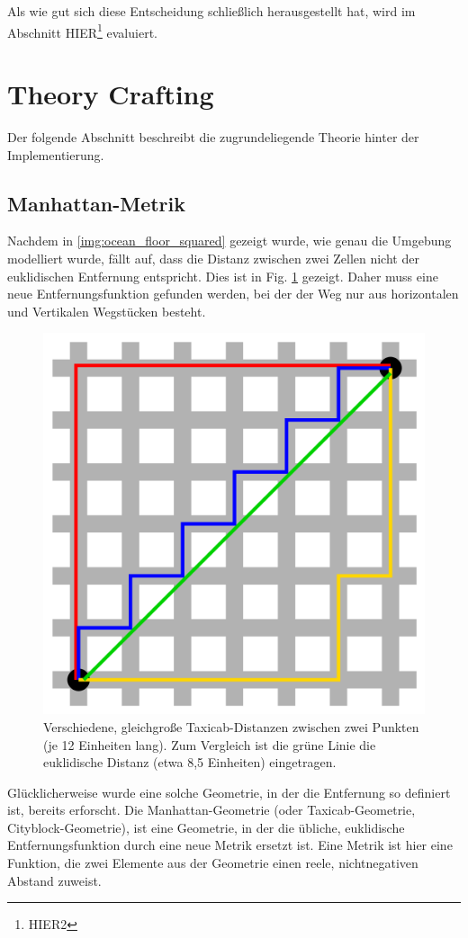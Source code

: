 \documentclass{article}
\begin{document}
Als wie gut sich diese Entscheidung schließlich herausgestellt hat, wird im Abschnitt 
HIER\footnote{HIER2} evaluiert.

\clearpage
\section{Theory Crafting}

Der folgende Abschnitt beschreibt die zugrundeliegende Theorie hinter der Implementierung.

\subsection{Manhattan-Metrik}
\label{sec:manhattan}

Nachdem in \ref{img:ocean_floor_squared} gezeigt wurde, wie genau die Umgebung
modelliert wurde, fällt auf, dass die Distanz zwischen zwei Zellen nicht der euklidischen Entfernung
entspricht. Dies ist in Fig. \ref{img:taxicab_euclid} gezeigt. Daher muss eine neue Entfernungsfunktion 
gefunden werden, bei der der Weg nur aus horizontalen und Vertikalen Wegstücken besteht.

\begin{figure}[!ht]
  \centering
  \includegraphics[width=.45\textwidth]{img/taxicab_distance.png}
  \caption{Verschiedene, gleichgroße Taxicab-Distanzen zwischen zwei Punkten (je 12 Einheiten lang). 
  Zum  Vergleich ist die grüne Linie die euklidische Distanz (etwa 8,5 Einheiten) eingetragen. \cite{wikicity}}
  \label{img:taxicab_euclid}
\end{figure}

Glücklicherweise wurde eine solche Geometrie, in der die Entfernung so definiert ist, bereits erforscht.
Die Manhattan-Geometrie (oder Taxicab-Geometrie, Cityblock-Geometrie), ist eine Geometrie, in der
die übliche, euklidische Entfernungsfunktion durch eine neue Metrik ersetzt ist. Eine Metrik ist hier
eine Funktion, die zwei Elemente aus der Geometrie einen reele, nichtnegativen Abstand zuweist.
\end{document}
